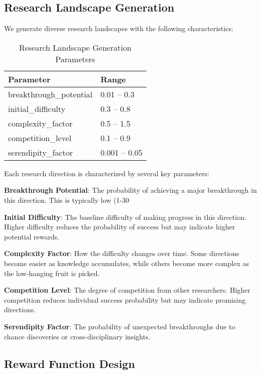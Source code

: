 \documentclass[letterpaper]{article} %
\begin{document}
\subsection{Research Landscape Generation}

We generate diverse research landscapes with the following characteristics:

\begin{table}[t]
\centering
\begin{tabular}{ll}
\toprule
\textbf{Parameter} & \textbf{Range} \\
\midrule
breakthrough\_potential & 0.01 -- 0.3 \\
initial\_difficulty & 0.3 -- 0.8 \\
complexity\_factor & 0.5 -- 1.5 \\
competition\_level & 0.1 -- 0.9 \\
serendipity\_factor & 0.001 -- 0.05 \\
\bottomrule
\end{tabular}
\caption{Research Landscape Generation Parameters}
\end{table}

Each research direction is characterized by several key parameters:

\textbf{Breakthrough Potential}: The probability of achieving a major breakthrough in this direction. This is typically low (1-30%

\textbf{Initial Difficulty}: The baseline difficulty of making progress in this direction. Higher difficulty reduces the probability of success but may indicate higher potential rewards.

\textbf{Complexity Factor}: How the difficulty changes over time. Some directions become easier as knowledge accumulates, while others become more complex as the low-hanging fruit is picked.

\textbf{Competition Level}: The degree of competition from other researchers. Higher competition reduces individual success probability but may indicate promising directions.

\textbf{Serendipity Factor}: The probability of unexpected breakthroughs due to chance discoveries or cross-disciplinary insights.

\subsection{Reward Function Design}
\end{document}
